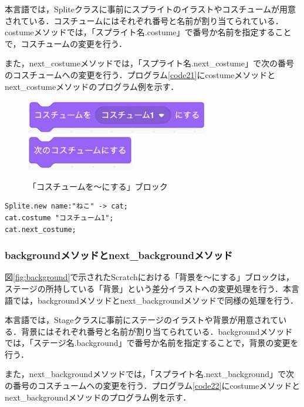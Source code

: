 \documentclass[10pt,a4j]{ltjsarticle}
\begin{document}
本言語では，Spliteクラスに事前にスプライトのイラストやコスチュームが用意されている．コスチュームにはそれぞれ番号と名前が割り当てられている．costumeメソッドでは，「スプライト名.costume」で番号か名前を指定することで，コスチュームの変更を行う．

また，next\_costumeメソッドでは，「スプライト名.next\_costume」で次の番号のコスチュームへの変更を行う．プログラム\ref{code21}にcostumeメソッドとnext\_costumeメソッドのプログラム例を示す．

\begin{figure}[H]
  \centering
  \includegraphics[height=15mm]{images/wear.pdf} \\
  \includegraphics[height=15mm]{images/next_wear.pdf} 
  \caption{「コスチュームを〜にする」ブロック}
  \label{fig:costume}
\end{figure}

\begin{lstlisting}[caption=costumeメソッドとnext\_costumeメソッドのプログラム例, label=code21]
Splite.new name:"ねこ" -> cat;
cat.costume "コスチューム1";
cat.next_costume;
\end{lstlisting}

\subsubsection{backgroundメソッドとnext\_backgroundメソッド}
図\ref{fig:background}で示されたScratchにおける「背景を〜にする」ブロックは，ステージの所持している「背景」という差分イラストへの変更処理を行う．本言語では，backgroundメソッドとnext\_backgroundメソッドで同様の処理を行う．

本言語では，Stageクラスに事前にステージのイラストや背景が用意されている．背景にはそれぞれ番号と名前が割り当てられている．backgroundメソッドでは，「ステージ名.background」で番号か名前を指定することで，背景の変更を行う．

また，next\_backgroundメソッドでは，「スプライト名.next\_background」で次の番号のコスチュームへの変更を行う．プログラム\ref{code22}にcostumeメソッドとnext\_backgroundメソッドのプログラム例を示す．
\end{document}
